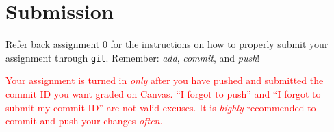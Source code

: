 \section{Submission}

Refer back assignment 0 for the instructions on how to properly submit
your assignment through \texttt{git}. Remember: \emph{add},
\emph{commit}, and \emph{push}!

\textcolor{red}{Your assignment is turned in \emph{only} after you have
pushed and submitted the commit ID you want graded on Canvas. ``I
forgot to push'' and ``I forgot to submit my commit ID'' are not valid
excuses. It is \emph{highly} recommended to commit and push your changes
\emph{often}.}
